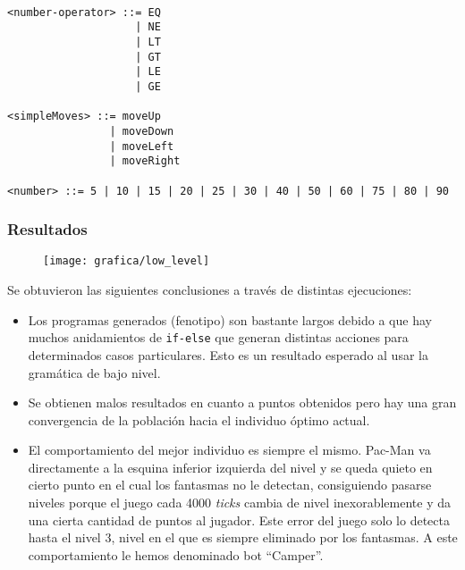 \begin{lstlisting}[frame=single, breaklines=no, basicstyle=\fontsize{10}{11}\ttfamily, caption=Gramática de bajo nivel]
 
<number-operator> ::= EQ
                    | NE
                    | LT
                    | GT
                    | LE
                    | GE
 
<simpleMoves> ::= moveUp
                | moveDown
                | moveLeft
                | moveRight
 
<number> ::= 5 | 10 | 15 | 20 | 25 | 30 | 40 | 50 | 60 | 75 | 80 | 90
\end{lstlisting}

\subsubsection{Resultados}
\begin{figure}[H]
\centering
\texttt{[image: grafica/low\_level]}
\end{figure}

Se obtuvieron las siguientes conclusiones a través de distintas ejecuciones:
\begin{itemize}
\item Los programas generados (fenotipo) son bastante largos debido a que hay muchos anidamientos de \texttt{if-else} que generan distintas acciones para determinados casos particulares. Esto es un resultado esperado al usar la gramática de bajo nivel.

\item Se obtienen malos resultados en cuanto a puntos obtenidos pero hay una gran convergencia de la población hacia el individuo óptimo actual.

\item El comportamiento del mejor individuo es siempre el mismo. Pac-Man va directamente a la esquina inferior izquierda del nivel y se queda quieto en cierto punto en el cual los fantasmas no le detectan, consiguiendo pasarse niveles porque el juego cada 4000 \textit{ticks} cambia de nivel inexorablemente y da una cierta cantidad de puntos al jugador. Este error del juego solo lo detecta hasta el nivel 3, nivel en el que es siempre eliminado por los fantasmas. A este comportamiento le hemos denominado bot ``Camper''.
\end{itemize}

